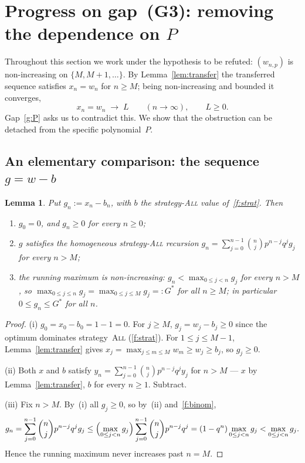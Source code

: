 \documentclass[11pt]{article}
\newtheorem{lemma}[theorem]{Lemma}
\theoremstyle{definition}
\newcommand{\All}{\textsc{All}}
\begin{document}
\section{Progress on gap~(G3): removing the dependence on
  \texorpdfstring{$P$}{P}}\label{sec:G3}

Throughout this section we work under the hypothesis to be refuted:
$(w_{n,p})$ is non-increasing on $\{M,M+1,\dots\}$. By
Lemma~\ref{lem:transfer} the transferred sequence satisfies $x_n=w_n$
for $n\ge M$; being non-increasing and bounded it converges,
\[
  x_n=w_n\;\longrightarrow\;L\qquad(n\to\infty),\qquad L\ge 0.
\]
Gap~\ref{g:P} asks us to contradict this. We show that the obstruction
can be detached from the specific polynomial~$P$.

\subsection{An elementary comparison: the sequence $g=w-b$}

\begin{lemma}\label{lem:g}
  Put $g_n:=x_n-b_n$, with $b$ the strategy-\All{} value
  of~\ref{f:strat}. Then
  \begin{enumerate}[label=\rm(\roman*),leftmargin=2.4em]
  \item $g_0=0$, and $g_n\ge 0$ for every $n\ge 0$;
  \item $g$ satisfies the homogeneous strategy-\All{} recursion
    $g_n=\sum_{j=0}^{n-1}\binom nj p^{n-j}q^j g_j$ for every $n>M$;
  \item the running maximum is non-increasing: $g_n<\max_{0\le
    j<n}g_j$ for every $n>M$, so $\max_{0\le j\le n}g_j=\max_{0\le
    j\le M}g_j=:G^\ast$ for all $n\ge M$; in particular $0\le g_n\le
    G^\ast$ for all $n$.
  \end{enumerate}
\end{lemma}

\begin{proof}
  (i) $g_0=x_0-b_0=1-1=0$. For $j\ge M$, $g_j=w_j-b_j\ge 0$ since the
  optimum dominates strategy~\All{} (\ref{f:strat}). For $1\le j\le
  M-1$, Lemma~\ref{lem:transfer} gives $x_j=\max_{j\le m\le M}w_m\ge
  w_j\ge b_j$, so $g_j\ge 0$.

  (ii) Both $x$ and $b$ satisfy
  $y_n=\sum_{j=0}^{n-1}\binom nj p^{n-j}q^j y_j$ for $n>M$ --- $x$ by
  Lemma~\ref{lem:transfer}, $b$ for every $n\ge 1$. Subtract.

  (iii) Fix $n>M$. By~(i) all $g_j\ge 0$, so by~(ii) and~\ref{f:binom},
  \[
    g_n=\sum_{j=0}^{n-1}\binom nj p^{n-j}q^j g_j
    \le\Bigl(\max_{0\le j<n}g_j\Bigr)\sum_{j=0}^{n-1}\binom nj
    p^{n-j}q^j=(1-q^n)\max_{0\le j<n}g_j<\max_{0\le j<n}g_j .
  \]
  Hence the running maximum never increases past $n=M$.
\end{proof}
\end{document}
